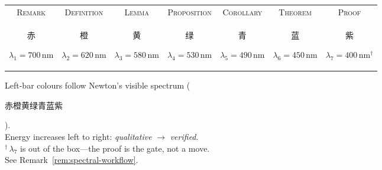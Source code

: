 \documentclass[11pt,a4paper]{article}
\begin{document}
\bigskip
\begin{center}
\small
\renewcommand{\arraystretch}{1.15}
\begin{tabular}{@{}ccccccc@{}}
\textcolor{specRed}{\textsc{Remark}} &
\textcolor{specOrange}{\textsc{Definition}} &
\textcolor{specYellow}{\textsc{Lemma}} &
\textcolor{specGreen}{\textsc{Proposition}} &
\textcolor{specCyan}{\textsc{Corollary}} &
\textcolor{specBlue}{\textsc{Theorem}} &
\textcolor{specViolet}{\textsc{Proof}} \\[1pt]
{\scriptsize\textcolor{specRed}{\begin{CJK}{UTF8}{gbsn}赤\end{CJK}\;$\lambda_1\!=\!700$\,nm}} &
{\scriptsize\textcolor{specOrange}{\begin{CJK}{UTF8}{gbsn}橙\end{CJK}\;$\lambda_2\!=\!620$\,nm}} &
{\scriptsize\textcolor{specYellow}{\begin{CJK}{UTF8}{gbsn}黄\end{CJK}\;$\lambda_3\!=\!580$\,nm}} &
{\scriptsize\textcolor{specGreen}{\begin{CJK}{UTF8}{gbsn}绿\end{CJK}\;$\lambda_4\!=\!530$\,nm}} &
{\scriptsize\textcolor{specCyan}{\begin{CJK}{UTF8}{gbsn}青\end{CJK}\;$\lambda_5\!=\!490$\,nm}} &
{\scriptsize\textcolor{specBlue}{\begin{CJK}{UTF8}{gbsn}蓝\end{CJK}\;$\lambda_6\!=\!450$\,nm}} &
{\scriptsize\textcolor{specViolet}{\begin{CJK}{UTF8}{gbsn}紫\end{CJK}\;$\lambda_7\!=\!400$\,nm$^{\dagger}$}} \\
\end{tabular}
\renewcommand{\arraystretch}{1.0}

\smallskip
{\footnotesize
Left-bar colours follow Newton's visible spectrum
(\begin{CJK}{UTF8}{gbsn}赤橙黄绿青蓝紫\end{CJK}).\\
Energy increases left to right: \emph{qualitative}
$\longrightarrow$ \emph{verified}.\\
$^{\dagger}$\,$\lambda_7$ is out of the box---the proof is the gate, not a move.\\
See Remark~\ref{rem:spectral-workflow}.}
\end{center}
\bigskip
\end{document}
